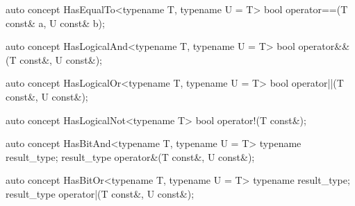 \documentclass[american,twoside]{book}
\begin{document}
\begin{itemdecl}
auto concept HasEqualTo<typename T, typename U = T> {
  bool operator==(T const& a, U const& b);
}
\end{itemdecl}

\begin{itemdescr}
\pnum
{}
\end{itemdescr}

\begin{itemdecl}
auto concept HasLogicalAnd<typename T, typename U = T> {
  bool operator&&(T const&, U const&);
}
\end{itemdecl}

\begin{itemdescr}
\pnum
{}
\end{itemdescr}

\begin{itemdecl}
auto concept HasLogicalOr<typename T, typename U = T> {
  bool operator||(T const&, U const&);
}
\end{itemdecl}

\begin{itemdescr}
\pnum
{}
\end{itemdescr}

\begin{itemdecl}
auto concept HasLogicalNot<typename T> {
  bool operator!(T const&);
}
\end{itemdecl}

\begin{itemdescr}
\pnum
{}
\end{itemdescr}

\begin{itemdecl}
auto concept HasBitAnd<typename T, typename U = T> {
  typename result_type;
  result_type operator&(T const&, U const&);
}
\end{itemdecl}

\begin{itemdescr}
\pnum
{}
\end{itemdescr}

\begin{itemdecl}
auto concept HasBitOr<typename T, typename U = T> {
  typename result_type;
  result_type operator|(T const&, U const&);
}
\end{itemdecl}
\end{document}
